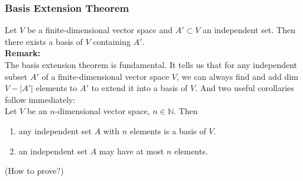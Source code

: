 \documentclass[12pt, t]{beamer}
\newcommand{\N}{\mathbb{N}}
\newcommand{\nullspace}{~\\[15pt]}
\newcommand{\remark}{\textbf{Remark: }}
\begin{document}
\begin{frame}
    \frametitle{Basis Extension Theorem}
    Let $V$ be a finite-dimensional vector space and $A'\subset V$ an independent set. Then there exists a basis of $V$ containing $A'$.
    \nullspace
    \remark\\
    The basis extension theorem is fundamental. It tells us that for any independent subset $A'$ of a finite-dimensional vector space $V$, we can always find and add dim $V-|A'|$ elements to $A'$ to extend it into a basis of $V$. And two useful corollaries follow immediately:\nullspace
    Let $V$ be an $n$-dimensional vector space, $n\in\N$. Then\\
    \begin{enumerate}
        \item any independent set $A$ with $n$ elements is a basis of $V$.
        \item an independent set $A$ may have at most $n$ elements.
    \end{enumerate}
    (How to prove?)
\end{frame}
\end{document}
